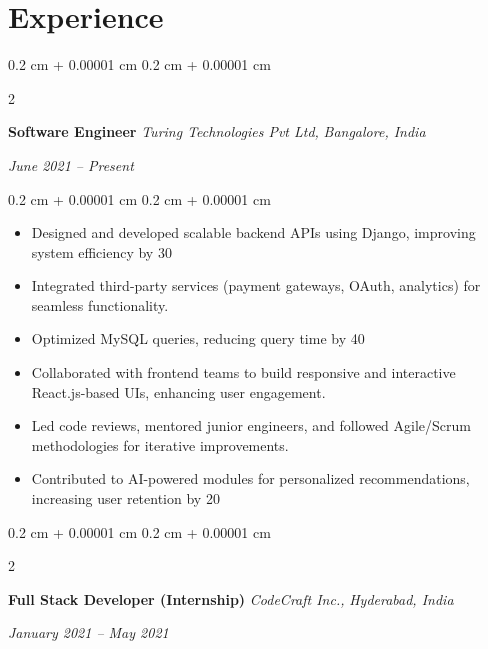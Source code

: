 \documentclass[10pt, letterpaper]{article}
\newenvironment{highlightsforbulletentries}{
        \begin{itemize}[
            topsep=0.10 cm,
            parsep=0.10 cm,
            partopsep=0pt,
            itemsep=0pt,
            leftmargin=10pt
        ]
    }{
        \end{itemize}
    }
\newenvironment{onecolentry}{
        \begin{adjustwidth}{
            0.2 cm + 0.00001 cm
        }{
            0.2 cm + 0.00001 cm
        }
    }{
        \end{adjustwidth}
    }
\newenvironment{twocolentry}[2][]{
        \onecolentry
        \def\secondColumn{#2}
        \setcolumnwidth{\fill, 4.5 cm}
        \begin{paracol}{2}
    }{
        \switchcolumn \raggedleft \secondColumn
        \end{paracol}
        \endonecolentry
    }
\begin{document}
        \section{Experience}
            \begin{twocolentry}{
            \textit{June 2021 – Present}
            
            \textit{}}
            \textbf{Software Engineer} \newline   
            \textit{Turing Technologies Pvt Ltd,} 
            \textit{Bangalore, India} 
            \end{twocolentry}
            \vspace{0.10 cm}
            \begin{onecolentry}
                \begin{highlightsforbulletentries}
                    \item \textbf{} Designed and developed scalable backend APIs using Django, improving system efficiency by 30%
                    \vspace{-2pt}
                    \item \textbf{} Integrated third-party services (payment gateways, OAuth, analytics) for seamless functionality.
                    \vspace{-2pt}
                    \item \textbf{} Optimized MySQL queries, reducing query time by 40%
                    \vspace{-2pt}
                    \item \textbf{} Collaborated with frontend teams to build responsive and interactive React.js-based UIs, enhancing user engagement.
                    \vspace{-2pt}
                    \item \textbf{} Led code reviews, mentored junior engineers, and followed Agile/Scrum methodologies for iterative improvements.
                    \vspace{-2pt}
                    \item \textbf{} Contributed to AI-powered modules for personalized recommendations, increasing user retention by 20%
                    \vspace{-2pt}
            \end{highlightsforbulletentries}
            \end{onecolentry}
            \vspace{0.2 cm}
            \begin{twocolentry}{
            \textit{January 2021 – May 2021}
            
            \textit{}}
            \textbf{Full Stack Developer (Internship)} \newline   
            \textit{CodeCraft Inc.,} 
            \textit{Hyderabad, India} 
            \end{twocolentry}
\end{document}
